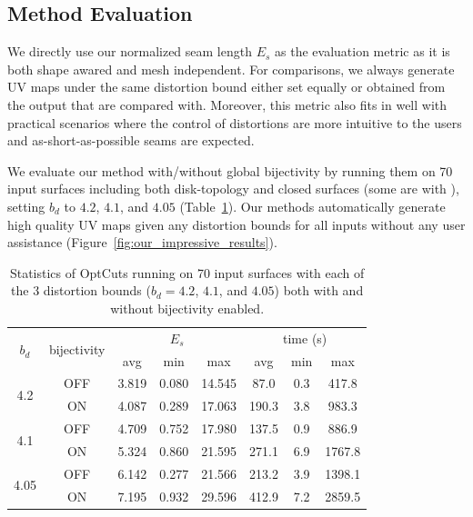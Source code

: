 \subsection{Method Evaluation}

We directly use our normalized seam length $E_{s}$ as the evaluation metric as it is both shape awared and mesh independent. For comparisons, we always generate UV maps under the same distortion bound either set equally or obtained from the output that are compared with.
Moreover, this metric also fits in well with practical scenarios where the control of distortions are more intuitive to the users and as-short-as-possible seams are expected.

We evaluate our method with/without global bijectivity by running them on 70 input surfaces including both disk-topology and closed surfaces (some are with ), setting $b_d$ to $4.2$, $4.1$, and $4.05$ (Table~\ref{tb:stats_OptCuts}). Our methods automatically generate high quality UV maps given any distortion bounds for all inputs without any user assistance (Figure~\ref{fig:our_impressive_results}).

\begin{table}[!h]
\centering
\caption{Statistics of OptCuts running on 70 input surfaces with each of the 3 distortion bounds ($b_d = 4.2$, $4.1$, and $4.05$) both with and without bijectivity enabled.}
\label{tb:stats_OptCuts}
\begin{tabular}{|c|c|ccc|ccc|}
\hline
\multirow{2}{*}{$b_d$} & \multirow{2}{*}{bijectivity} & \multicolumn{3}{c|}{$E_{s}$} & \multicolumn{3}{c|}{time (s)} \\ \cline{3-8} 
                       &                         & avg      & min     & max      & avg       & min    & max      \\ \hline
\multirow{2}{*}{4.2}   & OFF                    & 3.819   & 0.080  & 14.545  & 87.0   & 0.3 & 417.8 \\
                       & ON                & 4.087   & 0.289  & 17.063  & 190.3   & 3.8 & 983.3  \\ \hline
\multirow{2}{*}{4.1}   & OFF                    & 4.709   & 0.752  & 17.980  & 137.5  & 0.9 & 886.9 \\
                       & ON                & 5.324   & 0.860  & 21.595  & 271.1   & 6.9 & 1767.8  \\ \hline
\multirow{2}{*}{4.05}  & OFF                    & 6.142   & 0.277  & 21.566  & 213.2  & 3.9 & 1398.1   \\
                       & ON                & 7.195   & 0.932  & 29.596  & 412.9   & 7.2 & 2859.5 \\ \hline
\end{tabular}
\end{table}

